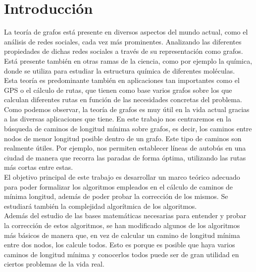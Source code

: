 %


\chapter{Introducción}

La teoría de grafos está presente en diversos aspectos del mundo actual, como el análisis de redes sociales, cada vez más prominentes. Analizando las diferentes propiedades de dichas redes sociales a través de su representación como grafos. Está presente también en otras ramas de la ciencia, como por ejemplo la química, donde se utiliza para estudiar la estructura química de diferentes moléculas. \\

Esta teoría es predominante también en aplicaciones tan importantes como el GPS o el cálculo de rutas, que tienen como base varios grafos sobre los que calculan diferentes rutas en función de las necesidades concretas del problema. \\

Como podemos observar, la teoría de grafos es muy útil en la vida actual gracias a las diversas aplicaciones que tiene. En este trabajo nos centraremos en la búsqueda de caminos de longitud mínima sobre grafos, es decir, los caminos entre nodos de menor longitud posible dentro de un grafo. Este tipo de caminos son realmente útiles. Por ejemplo, nos permiten establecer líneas de autobús en una ciudad de manera que recorra las paradas de forma óptima, utilizando las rutas más cortas entre estas. \\

El objetivo principal de este trabajo es desarrollar un marco teórico adecuado para poder formalizar los algoritmos empleados en el cálculo de caminos de mínima longitud, además de poder probar la corrección de los mismos. Se estudiará también la complejidad algorítmica de los algoritmos. \\

Además del estudio de las bases matemáticas necesarias para entender y probar la corrección de estos algoritmos, se han modificado algunos de los algoritmos más básicos de manera que, en vez de calcular un camino de longitud mínima entre dos nodos, los calcule todos. Esto es porque es posible que haya varios caminos de longitud mínima y conocerlos todos puede ser de gran utilidad en ciertos problemas de la vida real. \\

